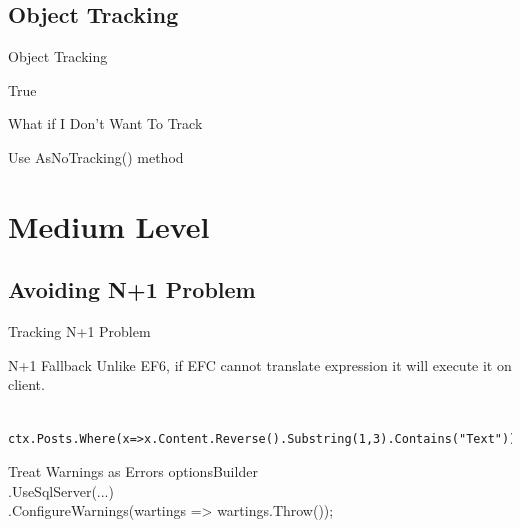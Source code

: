 \documentclass{bredelebeamer}
\begin{document}
\subsection{Object Tracking}
\begin{frame}{Object Tracking}
    
    \pause
    \begin{exampleblock}{}
        True
    \end{exampleblock}
\end{frame}

\begin{frame}{What if I Don't Want To Track}
    \begin{exampleblock}{}
        Use AsNoTracking() method
    \end{exampleblock}{}
\end{frame}

\section{Medium Level}
\subsection{Avoiding N+1 Problem}
\begin{frame}[fragile]{Tracking N+1 Problem}
    \begin{alertblock}{N+1 Fallback}
        Unlike EF6, if EFC cannot translate expression it will execute it on client.
    \end{alertblock}
    \begin{lstlisting}
    ctx.Posts.Where(x=>x.Content.Reverse().Substring(1,3).Contains("Text"));
    \end{lstlisting}
    \pause
    \begin{exampleblock}{Treat Warnings as Errors}
        optionsBuilder\\
                .UseSqlServer(...)\\
                .ConfigureWarnings(wartings => wartings.Throw());
    \end{exampleblock}
\end{frame}
\end{document}
